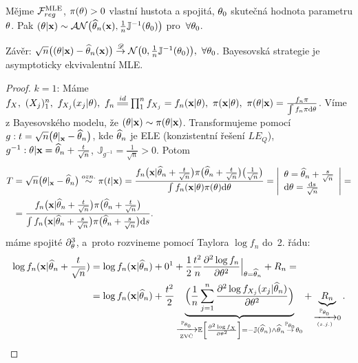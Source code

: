 \begin{dusl}
	Mějme $\mathcal{F}_{reg}^{\mathrm{{\footnotesize MLE }}}$, $\pi(\theta)>0$ vlastní hustota a spojitá, $\theta_0$ skutečná hodnota parametru $\theta$. Pak $(\theta|\textbf{x})\sim\mathcal{AN}\big(\widehat{\theta}_n(\textbf{x}),\frac{1}{n}\mathbb{J}^{-1}(\theta_0)\big)$ pro~$\forall\theta_0$.
	
	Závěr: $\sqrt{n}\big( (\theta|\textbf{x})-\widehat{\theta}_n(\textbf{x}) \big)\stackrel{\mathscr{D}}{\to} \mathcal{N}\big( 0,\frac{1}{n}\mathbb{J}^{-1}(\theta_0) \big),~\forall\theta_0$. Bayesovská strategie je asymptoticky ekvivalentní MLE.
	\begin{proof}
		$k=1$: Máme $f_{X},~(X_j)_1^n,~f_{X_j}(x_j|\t),~f_n\equal{id}\prod_1^n f_{X_j}=f_n(\textbf{x}|\t),~\pi(\textbf{x}|\t),~\pi(\t|\textbf{x})=\frac{f_n \pi}{\int f_n \pi\d\t}$. Víme z Bayesovského modelu, že $(\theta|\textbf{x})\sim\pi(\theta|\textbf{x})$. Transformujeme pomocí $g: t=\sqrt{n}\big( \theta|_\textbf{x}-\widehat{\theta}_n \big)$, kde $\widehat{\theta}_n$ je ELE (konzistentní řešení $LE_Q$), $g^{-1}:\theta|\textbf{x}=\widehat{\theta}_n + \frac{t}{\sqrt{n}}$, $\mathbb{J}_{g^{-1}}=\frac{1}{\sqrt{n}}>0$. Potom
		\[
		\begin{split}
		T&=\sqrt{n}\big(\theta|_\textbf{x}-\widehat{\theta}_n\big)\stackrel{ozn.}{\sim}\pi(t|\textbf{x})=\frac{f_n\big(\textbf{x}|\widehat{\theta}_n+\frac{t}{\sqrt{n}}\big)\pi\big( \widehat{\theta}_n+\frac{t}{\sqrt{n}} \big)\big(\frac{1}{\sqrt{n}}\big)}{\int f_n(\textbf{x}|\theta)\pi(\theta)\mathrm{d}\theta}=\left|\begin{array}{l}
		\theta=\widehat{\theta}_n+\frac{s}{\sqrt{n}}\\\mathrm{d}\theta=\frac{\mathrm{d} s}{\sqrt{n}}\end{array}
		\right|=\\ &=\frac{f_n\big(\textbf{x}|\widehat{\theta}_n+\frac{t}{\sqrt{n}}\big)\pi\big( \widehat{\theta}_n+\frac{t}{\sqrt{n}} \big)}{\int f_n\big(\textbf{x}|\widehat{\theta}_n+\frac{s}{\sqrt{n}}\big)\pi\big( \widehat{\theta}_n+\frac{s}{\sqrt{n}} \big)\mathrm{d} s}.
		\end{split}
		\]
		máme spojité $\partial_\theta^3$, a~proto rozvineme pomocí Taylora $\log f_n$ do~2. řádu:
		\[
		\begin{split}
		\log f_n(\textbf{x}|\htn+\frac{t}{\sqrt{n}})&=\log f_n(\textbf{x}|\htn)+0\text{\footnotemark}+\frac{1}{2}\frac{t^2}{n}\frac{\partial^2 \log f_n}{\partial\t^2}\Big|_{\t=\htn}+R_n=\\&=\log f_n(\textbf{x}|\htn)+\frac{t^2}{2}\underbrace{\Big( \frac{1}{n}\sumjn \frac{\partial^2 \log f_{X_j}(x_j|\htn)}{\partial\t^2} \Big)}_{\xrightarrow[\text{ZVČ}]{\PP_{\t_0}}\EE{\frac{\partial^2\log f_X}{\partial\t^2}}=-\mathbb{J}(\htn)\wedge \htn \stackrel{\PP_{\t_0}}{\rightarrow} \t_0}+\underbrace{R_n}_{\xrightarrow[(s.j.)]{\PP_{\t_0}}0}.
		\end{split}
		\]

\end{proof}
\end{dusl}
